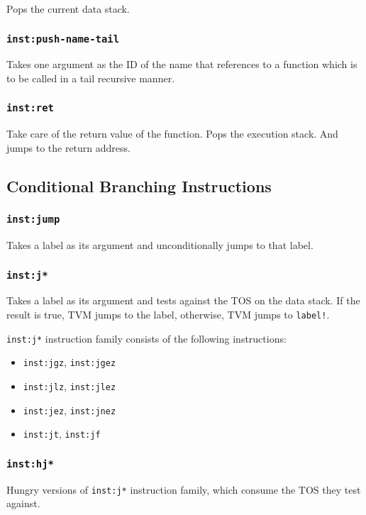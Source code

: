 \documentclass{article}
\newcommand{\inst}[1] {\texttt{inst:#1}}
\begin{document}
Pops the current data stack.

\subsubsection{\inst{push-name-tail}}

Takes one argument as the ID of the name that references to a function which is to be called in a tail recursive manner.

\subsubsection{\inst{ret}}

Take care of the return value of the function. Pops the execution stack. And jumps to the return address.

\subsection{Conditional Branching Instructions}

\subsubsection{\inst{jump}}

Takes a label as its argument and unconditionally jumps to that label.

\subsubsection{\inst{j*}}

Takes a label as its argument and tests against the TOS on the data stack. If the result is true, TVM jumps to the label, otherwise, TVM jumps to \texttt{label!}.

\inst{j*} instruction family consists of the following instructions:
\begin{itemize}
\item \inst{jgz}, \inst{jgez}
\item \inst{jlz}, \inst{jlez}
\item \inst{jez}, \inst{jnez}
\item \inst{jt}, \inst{jf}
\end{itemize}

\subsubsection{\inst{hj*}}

Hungry versions of \inst{j*} instruction family, which consume the TOS they test against.
\end{document}
